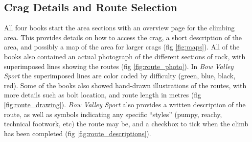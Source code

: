 \documentclass[10pt]{article}
\begin{document}
\subsection{Crag Details and Route Selection}

All four books start the area sections with an overview page for the climbing area. This provides details on how to access the crag, a short description of the area, and possibly a map of the area for larger crags (fig \ref{fig:maps}). All of the books also contained an actual photograph of the different sections of rock, with superimposed lines showing the routes (fig \ref{fig:route_photo}). In \emph{Bow Valley Sport} the superimposed lines are color coded by difficulty (green, blue, black, red). Some of the books also showed hand-drawn illustrations of the routes, with more details such as bolt location, and route length in metres (fig \ref{fig:route_drawing}). \emph{Bow Valley Sport} also provides a written description of the route, as well as symbols indicating any specific ``styles'' (pumpy, reachy, technical footwork, etc) the route may be, and a checkbox to tick when the climb has been completed (fig \ref{fig:route_descriptions}). 
\end{document}

